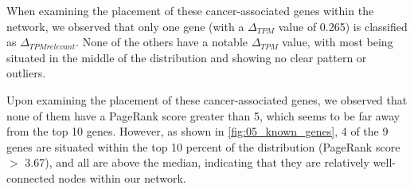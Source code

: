 When examining the placement of these cancer-associated genes within the network,
we observed that only one gene (with a $\Delta_{TPM}$ value of 0.265) is classified as $\Delta_{TPM relevant}$.
None of the others have a notable $\Delta_{TPM}$ value,
with most being situated in the middle of the distribution and showing no clear pattern or outliers.

Upon examining the placement of these cancer-associated genes, we observed that none of them have a PageRank score greater than 5,
which seems to be far away from the top 10 genes.
However, as shown in \cref{fig:05_known_genes},
4 of the 9 genes are situated within the top 10 percent of the distribution (PageRank score $>$ 3.67),
and all are above the median, indicating that they are relatively well-connected nodes within our network.

